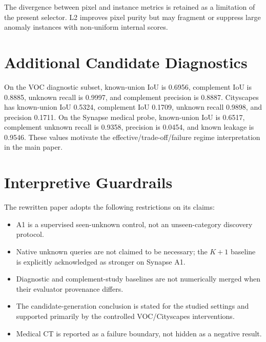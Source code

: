 \documentclass[11pt]{article}
\begin{document}
The divergence between pixel and instance metrics is retained as a limitation of the present selector. L2 improves pixel purity but may fragment or suppress large anomaly instances with non-uniform internal scores.

\section{Additional Candidate Diagnostics}
On the VOC diagnostic subset, known-union IoU is 0.6956, complement IoU is 0.8885, unknown recall is 0.9997, and complement precision is 0.8887. Cityscapes has known-union IoU 0.5324, complement IoU 0.1709, unknown recall 0.9898, and precision 0.1711. On the Synapse medical probe, known-union IoU is 0.6517, complement unknown recall is 0.9358, precision is 0.0454, and known leakage is 0.9546. These values motivate the effective/trade-off/failure regime interpretation in the main paper.

\section{Interpretive Guardrails}
The rewritten paper adopts the following restrictions on its claims:
\begin{itemize}[leftmargin=*,nosep]
  \item A1 is a supervised seen-unknown control, not an unseen-category discovery protocol.
  \item Native unknown queries are not claimed to be necessary; the $K+1$ baseline is explicitly acknowledged as stronger on Synapse A1.
  \item Diagnostic and complement-study baselines are not numerically merged when their evaluator provenance differs.
  \item The candidate-generation conclusion is stated for the studied settings and supported primarily by the controlled VOC/Cityscapes interventions.
  \item Medical CT is reported as a failure boundary, not hidden as a negative result.
\end{itemize}
\end{document}
